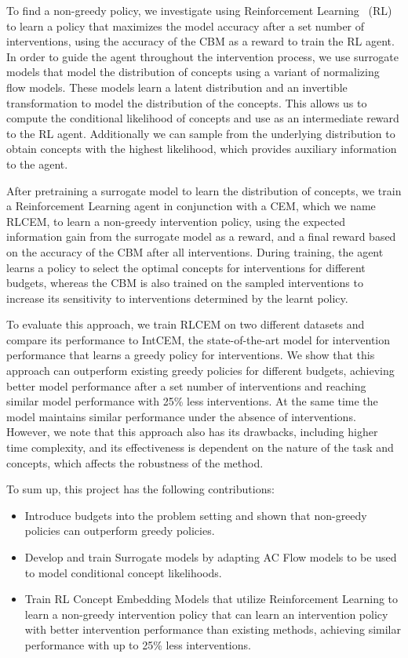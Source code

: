 \documentclass[../main.tex]{subfiles}
\begin{document}
To find a non-greedy policy, we investigate using Reinforcement Learning~\cite{rl} (RL) 
to learn a policy that maximizes
the model accuracy after a set number of interventions,
using the accuracy of the CBM as a reward to train the RL agent.
In order
to guide the agent throughout the intervention process,
we use surrogate models that model the distribution of concepts using
a variant of normalizing flow models. These models learn a latent distribution
and an invertible transformation to model the distribution of the concepts.
This allows us to compute the conditional likelihood of concepts 
and use as an intermediate reward to the RL agent. Additionally we can sample
from the underlying distribution to obtain concepts with the highest likelihood,
which provides auxiliary information to the agent.

After pretraining a surrogate model to learn the distribution of concepts,
we train a Reinforcement Learning agent in conjunction with a CEM, which we name RLCEM, to learn a 
non-greedy intervention policy, using
the expected information gain from the surrogate model
as a reward, and a final reward based on the 
accuracy of the CBM after all interventions.
During training,
the agent learns a policy to select
the optimal concepts for interventions for different budgets,
whereas the CBM is also trained on the sampled interventions
to increase its sensitivity to interventions determined by 
the learnt policy.

To evaluate this approach, we train RLCEM on two different datasets
and compare its performance to IntCEM, the state-of-the-art 
model for intervention performance that learns a greedy policy 
for interventions.
We show that this approach can outperform existing greedy policies
for different budgets, achieving better model performance
after a set number of interventions and reaching similar
model performance with 25\% less interventions. 
At the same time the model maintains similar performance under 
the absence of interventions. However, we note that
this approach also has its drawbacks, including
higher time complexity, and its effectiveness is dependent on 
the nature of the task and concepts, which affects the robustness of the method.

To sum up, this project has the following contributions:
\begin{itemize}
    \item Introduce budgets into the problem setting and shown that non-greedy policies can outperform greedy policies.
    \item Develop and train Surrogate models by adapting AC Flow models to be used to model conditional concept likelihoods.
    \item Train RL Concept Embedding Models that utilize Reinforcement Learning
    to learn a non-greedy intervention policy that can learn an intervention policy
    with better intervention performance than existing methods, achieving similar performance
    with up to 25\% less interventions.
\end{itemize}
\end{document}

